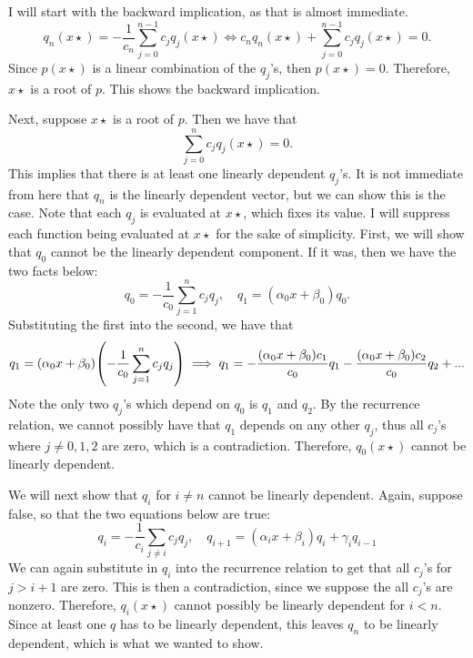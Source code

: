 \begin{solution}

    I will start with the backward implication, as that is almost immediate.
    \[q_n(x\star) = -\frac{1}{c_n}\sum_{j = 0}^{n-1}c_jq_j(x\star) \iff c_nq_n(x\star) + \sum_{j = 0}^{n-1}c_jq_j(x\star)= 0.\] 
    Since $p(x\star)$ is a linear combination of the $q_j$'s, then $p(x\star) = 0$. Therefore, $x\star$ is a root of $p$. This shows the backward implication. \par

    Next, suppose $x\star$ is a root of $p$. Then we have that 
    \[\sum_{j = 0}^n c_j q_j(x\star) = 0.\]
    This implies that there is at least one linearly dependent $q_j$'s. It is not immediate from here that $q_n$ is the linearly dependent vector, but we can show this is the case. Note that each $q_j$ is evaluated at $x\star$, which fixes its value. I will suppress each function being evaluated at $x\star$ for the sake of simplicity. First, we will show that $q_0$ cannot be the linearly dependent component. If it was, then we have the two facts below:
    \[q_0 = -\frac{1}{c_0}\sum_{j = 1}^n c_jq_j, \quad q_1 = (\alpha_0x + \beta_0)q_0.\]
    Substituting the first into the second, we have that 
    \[q_1 = (\alpha_0x + \beta_0)\qty(-\frac{1}{c_0}\sum_{j = 1}^n c_jq_j) \implies q_1 = -\frac{(\alpha_0x + \beta_0)c_1}{c_0}q_1  -\frac{(\alpha_0x + \beta_0)c_2}{c_0}q_2 + ...\]
    Note the only two $q_j$'s which depend on $q_0$ is $q_1$ and $q_2$. By the recurrence relation, we cannot possibly have that $q_1$ depends on any other $q_j$, thus all $c_j$'s where $j \neq 0, 1, 2$ are zero, which is a contradiction. Therefore, $q_0(x\star)$ cannot be linearly dependent. \par

    We will next show that $q_i$ for $i \neq n$ cannot be linearly dependent. Again, suppose false, so that the two equations below are true:
    \[q_i = -\frac{1}{c_i}\sum_{j \neq i} c_jq_j,  \quad q_{i+1} = (\alpha_i x + \beta_i)q_i + \gamma_iq_{i-1}\]
    We can again substitute in $q_i$ into the recurrence relation to get that all $c_j$'s for $j > i+1$ are zero. This is then a contradiction, since we suppose the all $c_j$'s are nonzero. Therefore, $q_i(x\star)$ cannot possibly be linearly dependent for $i < n$. Since at least one $q$ has to be linearly dependent, this leaves $q_n$ to be linearly dependent, which is what we wanted to show.  
\end{solution}

\newpage
